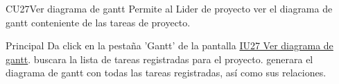 \begin{UseCase}{CU27}{Ver diagrama de gantt}{
		Permite al Lider de proyecto ver el diagrama de gantt conteniente de las tareas de proyecto.
	}
	\end{UseCase}
	\begin{UCtrayectoria}{Principal}
		\UCpaso[\UCactor] Da click en la pestaña 'Gantt' de la pantalla \hyperref[fig:IU27]{IU27 Ver diagrama de gantt}.
        \UCpaso [\UCsist] buscara la lista de tareas registradas para el proyecto.
        \UCpaso [\UCsist]  generara el diagrama de gantt con todas las tareas registradas, así como sus relaciones.
	\end{UCtrayectoria}
		
